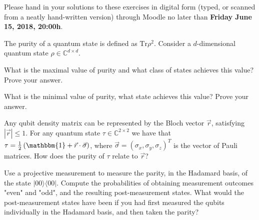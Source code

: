 \documentclass[a4paper,10pt,landscape,twocolumn]{scrartcl}
\newcommand{\proj}[1]{| #1 \rangle \langle #1 |}
\newcommand{\Tr}{\text{Tr}}
\newcommand\deadline{Friday June 15, 2018, 20:00h}
\begin{document}
\homeworkproblems

{\sffamily\noindent
Please hand in your solutions to these exercises in digital form (typed, or scanned from a neatly hand-written version) through Moodle no later than \textbf{\deadline}.  %
}


\begin{exercise}[Purity]
The purity of a quantum state is defined as $\Tr\rho^2$. Consider a $d$-dimensional quantum state $\rho\in \mathbb{C}^{d\times d}$.
\begin{subex}
What is the maximal value of purity and what class of states achieves this value? Prove your answer.
\end{subex}
\begin{subex}
What is the minimal value of purity, what state achieves this value? Prove your answer.
\end{subex}

\begin{subex}
Any qubit density matrix can be represented by the Bloch vector $\vec{r}$, satisfying $|\vec{r}|\leq 1$. For any quantum state $\tau\in \mathbb{C}^{2\times 2}$ we have that $\tau= \frac{1}{2}\left( \mathbbm{1} + \vec{r}\cdot \vec{\sigma} \right)$, where $\vec{\sigma}=(\sigma_x,\sigma_y,\sigma_z)^T$ is the vector of Pauli matrices. How does the purity of $\tau$ relate to $\vec{r}$?
\end{subex}

\end{exercise}



\begin{exercise}
Use a projective measurement to measure the parity, in the Hadamard basis, of
the state $\proj{00}$. Compute the probabilities of obtaining measurement outcomes "even" and
"odd", and the resulting post-measurement states. What would the post-measurement states have
been if you had first measured the qubits individually in the Hadamard basis, and then taken the
parity?
\end{exercise}
\end{document}

